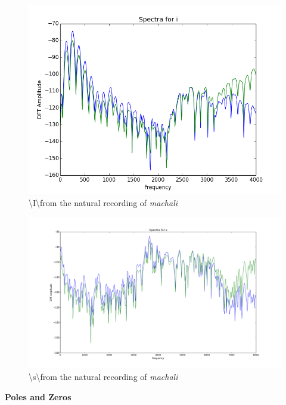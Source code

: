 \documentclass[a4paper]{article}
\begin{document}
\begin{figure}[h!]
    \includegraphics[width=\linewidth]{./images/spectra_i.png}
    \caption{\textbackslash I\textbackslash from the natural recording of \textit{machali}}
    \label{fig:1}
\end{figure}


\begin{figure}[h!]
    \includegraphics[width=\linewidth]{./images/spectra_s.png}
    \caption{ \textbackslash s\textbackslash from the natural recording of \textit{machali}}
    \label{fig:1}
\end{figure}



\newpage
\textbf{Poles and Zeros}
\end{document}
